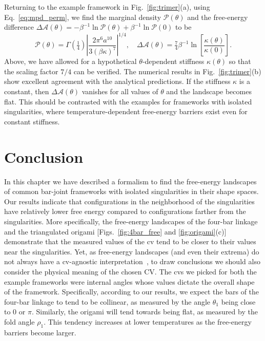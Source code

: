 Returning to the example framework in Fig.~\ref{fig:trimer}(a), using Eq.~\eqref{eq:mpd_perm}, we find the marginal density $\mathscr{P}(\theta)$ and the free-energy difference $\Delta\mathscr{A}(\theta) = -\beta^{-1}\ln\mathscr{P}(\theta) + \beta^{-1}\ln\mathscr{P}(0)$ to be
%
\begin{equation}
  \mathscr{P}(\theta) = \Gamma\left(\tfrac{1}{4}\right)\left|\frac{2\pi^{6}a^{10}}{3(\beta\kappa)^{7}}\right|^{1/4},
  \quad
  \Delta\mathscr{A}(\theta) = \tfrac{7}{4}\beta^{-1}\ln\left[\frac{\kappa(\theta)}{\kappa(0)}\right].
  \label{eq:trimer_free}
\end{equation}
%
Above, we have allowed for a hypothetical $\theta$-dependent stiffness $\kappa(\theta)$ so that the scaling factor $7/4$ can be verified.
The numerical results in Fig.~\ref{fig:trimer}(b) show excellent agreement with the analytical predictions.
If the stiffness $\kappa$ is a constant, then $\Delta\mathscr{A}(\theta)$ vanishes for all values of $\theta$ and the landscape becomes flat.
This should be contrasted with the examples for frameworks with isolated singularities, where temperature-dependent free-energy barriers exist even for constant stiffness.


\section{Conclusion}

In this chapter we have described a formalism to find the free-energy landscapes of common bar-joint frameworks with isolated singularities in their shape spaces.
Our results indicate that configurations in the neighborhood of the singularities have relatively lower free energy compared to configurations farther from the singularities.
More specifically, the free-energy landscapes of the four-bar linkage and the triangulated origami [Figs.~\ref{fig:4bar_free} and \ref{fig:origami}(c)] demonstrate that the measured values of the \ac{cv} tend to be closer to their values near the singularities.
Yet, as free-energy landscapes (and even their extrema) do not always have a \ac{cv}-agnostic interpretation~\cite{e2004,hartmann2007,frenkel2013}, to draw conclusions we should also consider the physical meaning of the chosen CV.
The \ac{cv}s we picked for both the example frameworks were internal angles whose values dictate the overall shape of the framework.
Specifically, according to our results, we expect the bars of the four-bar linkage to tend to be collinear, as measured by the angle $\theta_1$ being close to $0$ or $\pi$.
Similarly, the origami will tend towards being flat, as measured by the fold angle $\rho_1$.
This tendency increases at lower temperatures as the free-energy barriers become larger.

